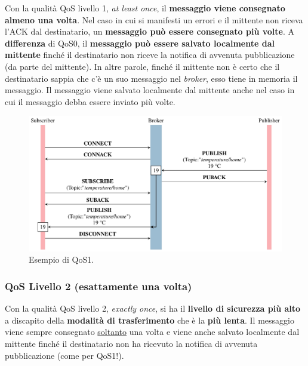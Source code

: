 \documentclass[a4paper]{article}
\begin{document}
	Con la qualità QoS livello 1, \emph{at least once}, il \textbf{messaggio viene consegnato almeno una volta}. Nel caso in cui si manifesti un errori e il mittente non riceva l'ACK dal destinatario, un \textbf{messaggio può essere consegnato più volte}. A \textbf{differenza} di QoS0, il \textbf{messaggio può essere salvato localmente dal mittente} finché il destinatario non riceve la notifica di avvenuta pubblicazione (da parte del mittente). In altre parole, finché il mittente non è certo che il destinatario sappia che c'è un suo messaggio nel \emph{broker}, esso tiene in memoria il messaggio. Il messaggio viene salvato localmente dal mittente anche nel caso in cui il messaggio debba essere inviato più volte.
	\begin{figure}[!htp]
		\centering
		\includegraphics[width=\textwidth]{img/pub-sub/QoS1.jpg}
		\caption{Esempio di QoS1.}
	\end{figure}\newpage
	
	\subsubsection{QoS Livello 2 (esattamente una volta)}
	
	Con la qualità QoS livello 2, \emph{exactly once}, si ha il \textbf{livello di sicurezza più alto} a discapito della \textbf{modalità di trasferimento} che è la \textbf{più lenta}. Il messaggio viene sempre consegnato \underline{soltanto} una volta e viene anche salvato localmente dal mittente finché il destinatario non ha ricevuto la notifica di avvenuta pubblicazione (come per QoS1!).\newline
	
\end{document}
